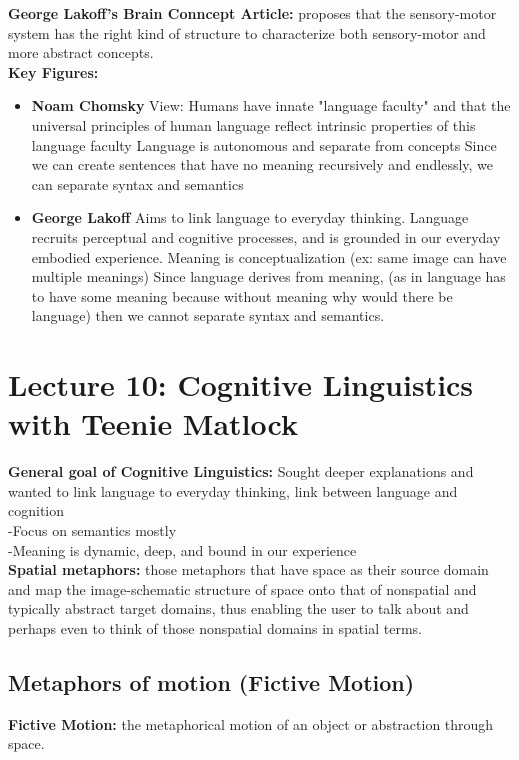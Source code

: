 \documentclass{article}
\begin{document}
\textbf{George Lakoff's Brain Conncept Article:} proposes that the sensory-motor system has the right kind of structure to characterize both sensory-motor and more abstract concepts. \\

\textbf{Key Figures:}
\begin{itemize}
    \item \textbf{Noam Chomsky}
        \subitem View: Humans have innate "language faculty" and that the universal principles of human language reflect intrinsic properties of this language faculty
        \subitem Language is autonomous and separate from concepts
        \subitem Since we can create sentences that have no meaning recursively and endlessly, we can separate syntax and semantics
    \item \textbf{George Lakoff}
        \subitem Aims to link language to everyday thinking. Language recruits perceptual and cognitive processes, and is grounded in our everyday embodied experience. 
        \subitem Meaning is conceptualization (ex: same image can have multiple meanings)
        \subitem Since language derives from meaning, (as in language has to have some meaning because without meaning why would there be language) then we cannot separate syntax and semantics. 
\end{itemize}

\newpage
\section{Lecture 10: Cognitive Linguistics with Teenie Matlock}

\textbf{General goal of Cognitive Linguistics:} Sought deeper explanations and wanted to link language to everyday thinking, link between language and cognition \\
\indent -Focus on semantics mostly\\
\indent -Meaning is dynamic, deep, and bound in our experience \\

\textbf{Spatial metaphors:} those metaphors that have space as their source domain and map the image-schematic structure of space onto that of nonspatial and typically abstract target domains, thus enabling the user to talk about and perhaps even to think of those nonspatial domains in spatial terms. \\

\subsection{Metaphors of motion (Fictive Motion)}
\textbf{Fictive Motion:} the metaphorical motion of an object or abstraction through space. \\
\end{document}
